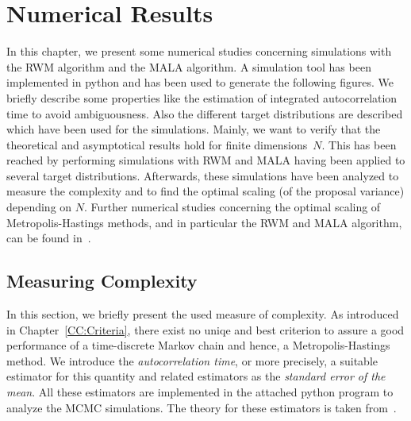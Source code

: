 \chapter{Numerical Results}
\label{Numerical Results}

In this chapter, we  present some numerical studies concerning simulations with the RWM algorithm and the MALA algorithm. A simulation tool has been implemented in python and has been used to generate the following figures. We  briefly describe some properties like the estimation of integrated autocorrelation time to avoid ambiguousness. Also the different target distributions are described which have been used for the simulations. Mainly, we want to verify that the theoretical and asymptotical results hold for finite dimensions~$N$. This has been reached by performing simulations with RWM and MALA having been applied to several target distributions. Afterwards, these simulations have been analyzed to measure the complexity and to find the optimal scaling (of the proposal variance) depending on $N$.
Further numerical studies concerning the optimal scaling of Metropolis-Hastings methods, and in particular the RWM and MALA algorithm, can be found in~\autocite{Beskos2008, Gelman1996, Roberts2001}.

\section{Measuring Complexity}
\label{NR- autocorrelation time}

In this section, we briefly present the used measure of complexity. As introduced in Chapter~\ref{CC:Criteria}, there exist no uniqe and best criterion to assure a good performance of a time-discrete Markov chain and hence, a Metropolis-Hastings method. We  introduce the \textit{autocorrelation time}, or more precisely, a suitable estimator for this quantity and related estimators as the \textit{standard error of the mean}. All these estimators are implemented in the attached python program to analyze the MCMC simulations. The theory for these estimators is taken from~\autocite{Geyer1992, Priestley1982}. 

